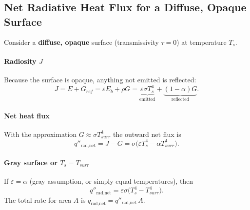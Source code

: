 \subsection*{Net Radiative Heat Flux for a Diffuse, Opaque Surface}
Consider a \textbf{diffuse, opaque} surface (transmissivity $\tau=0$) at temperature $T_s$.

\paragraph{Radiosity \(J\)}
Because the surface is opaque, anything not emitted is reflected:
\[
  J = E + G_{ref} = \varepsilon E_b+ \rho G = \underbrace{\varepsilon\sigma T_s^{4}}_{\text{emitted}} + \underbrace{(1-\alpha)G}_{\text{reflected}}.
\]

\paragraph{Net heat flux}
With the approximation $G \approx \sigma T_{surr}^{4}$ the outward net flux is
\[
  q''_{\text{rad,net}} = J - G = \sigma\bigl(\varepsilon T_s^{4} - \alpha T_{surr}^{4}\bigr).
\]

\paragraph{Gray surface or \(T_s=T_{surr}\)}
If \(\varepsilon=\alpha\) (gray assumption, or simply equal temperatures), then
\[
  q''_{\text{rad,net}} = \varepsilon\sigma\bigl(T_s^{4}-T_{surr}^{4}\bigr).
\]
The total rate for area $A$ is \(q_{\text{rad,net}} = q''_{\text{rad,net}}\,A\).


\textbf{}

\textbf{}


